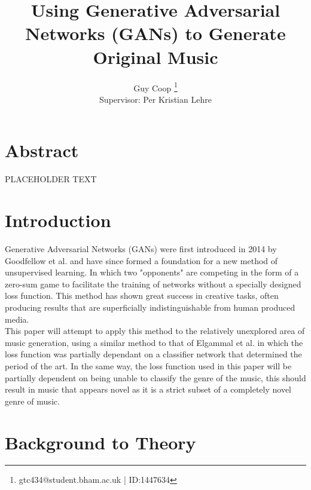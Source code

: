 \documentclass[10pt]{article}
\title{Using Generative Adversarial Networks (GANs) to Generate Original Music}
\author{Guy Coop \footnote{
gtc434@student.bham.ac.uk | ID:1447634}\\ 
Supervisor: Per Kristian Lehre
}
\begin{document}
\maketitle
{}
\section*{Abstract}
PLACEHOLDER TEXT\\
\lipsum[5]
\newpage

\tableofcontents
\newpage
\listoffigures
\listoftables
\newpage

\section{Introduction}
Generative Adversarial Networks (GANs) were first introduced in 2014 by Goodfellow et al. \cite{Goodfellow2014} and have since formed a foundation for a new method of unsupervised learning. In which two "opponents" are competing in the form of a zero-sum game to facilitate the training of networks without a specially designed loss function. This method has shown great success in creative tasks, often producing results that are superficially indistinguishable from human produced media. \\
This paper will attempt to apply this method to the relatively unexplored area of music generation, using a similar method to that of Elgammal et al. \cite{Elgammal2017} in which the loss function was partially dependant on a classifier network that determined the period of the art. In the same way, the loss function used in this paper will be partially dependent on being unable to classify the genre of the music, this should result in music that appears novel as it is a strict subset of a completely novel genre of music. \\
 


\section{Background to Theory}
\end{document}
